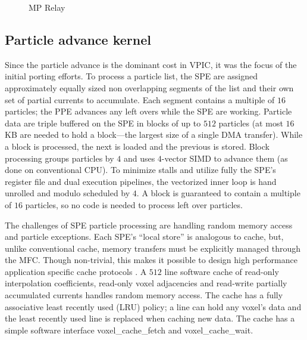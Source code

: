 \documentclass[10pt]{article}
\begin{document}
\begin{figure}
    \begin{center}
    \caption{MP Relay}
    \label{fig:relay}
    \end{center}
\end{figure}

\subsection{Particle advance kernel}

Since the particle advance is the dominant cost in VPIC, it was the
focus of the initial porting efforts.  To process a particle list, the
SPE are assigned approximately equally sized non overlapping segments
of the list and their own set of partial currents to accumulate.  Each
segment contains a multiple of $16$ particles; the PPE advances any
left overs while the SPE are working.  Particle data are triple
buffered on the SPE in blocks of up to $512$ particles (at most $16$
KB are needed to hold a block---the largest size of a single DMA
transfer).  While a block is processed, the next is loaded and the
previous is stored.
Block processing groups particles by $4$ and uses $4$-vector SIMD to
advance them (as done on conventional CPU).  To minimize
stalls and utilize fully the SPE's register file and dual execution
pipelines, the vectorized inner loop is hand unrolled and modulo
scheduled by $4$.  A block is guaranteed to contain a multiple
of $16$ particles, so no code is needed to process left over particles.

The challenges of SPE particle processing are handling random memory
access and particle exceptions.  Each SPE's ``local store'' is
analogous to cache, but, unlike conventional cache, memory transfers
must be explicitly managed through the MFC.  Though
non-trivial, this makes it possible to design high performance
application specific cache protocols \cite{Kahle_et_al_2005}.  A $512$
line software cache of read-only interpolation coefficients, read-only
voxel adjacencies and read-write partially accumulated currents
handles random memory access.  The cache has a fully associative least
recently used (LRU) policy; a line can hold any voxel's data and the
least recently used line is replaced when caching new data.  The cache
has a simple software interface voxel\_cache\_fetch and
voxel\_cache\_wait.
\end{document}
